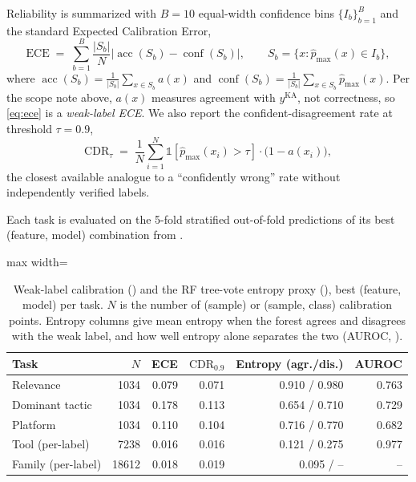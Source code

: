 \documentclass[preprint,12pt]{elsarticle}
\newenvironment{fittable}{\begin{adjustbox}{max width=\textwidth}}{\end{adjustbox}}
\begin{document}
Reliability is summarized with $B{=}10$ equal-width confidence bins
$\{I_b\}_{b=1}^{B}$ and the standard Expected Calibration Error,
\begin{equation}
\label{eq:ece}
\mathrm{ECE} \;=\; \sum_{b=1}^{B} \frac{|S_b|}{N}
  \left\lvert \operatorname{acc}(S_b) - \operatorname{conf}(S_b) \right\rvert,
\qquad
S_b = \{x : \hat p_{\max}(x) \in I_b\},
\end{equation}
where $\operatorname{acc}(S_b) = \frac{1}{|S_b|}\sum_{x \in S_b} a(x)$ and
$\operatorname{conf}(S_b) = \frac{1}{|S_b|}\sum_{x \in S_b} \hat p_{\max}(x)$.
Per the scope note above, $a(x)$ measures agreement with $y^{\mathrm{KA}}$,
not correctness, so \cref{eq:ece} is a \emph{weak-label ECE}. We also report
the confident-disagreement rate at threshold $\tau=0.9$,
\begin{equation}
\label{eq:cdr}
\mathrm{CDR}_\tau \;=\; \frac{1}{N}\sum_{i=1}^N
  \mathbb{1}\!\left[\hat p_{\max}(x_i) > \tau\right]\cdot\bigl(1-a(x_i)\bigr),
\end{equation}
the closest available analogue to a ``confidently wrong'' rate without
independently verified labels.

Each task is evaluated on the 5-fold stratified out-of-fold predictions
of its best (feature, model) combination from .

\begin{table}[htbp]
\centering
\caption{Weak-label calibration () and the RF
  tree-vote entropy proxy (), best (feature, model) per
  task. $N$ is the number of (sample) or (sample, class) calibration
  points. Entropy columns give mean entropy when the forest agrees and
  disagrees with the weak label, and how well entropy alone separates the
  two (AUROC, ).}
\label{tab:calibration}
\begin{fittable}
\begin{tabular}{lrrrrr}
\toprule
Task & $N$ & ECE & $\mathrm{CDR}_{0.9}$ & Entropy (agr./dis.) & AUROC \\
\midrule
Relevance        & 1034 & 0.079 & 0.071 & 0.910 / 0.980 & 0.763 \\
Dominant tactic   & 1034 & 0.178 & 0.113 & 0.654 / 0.710 & 0.729 \\
Platform          & 1034 & 0.110 & 0.104 & 0.716 / 0.770 & 0.682 \\
Tool (per-label)  & 7238 & 0.016 & 0.016 & 0.121 / 0.275 & 0.977 \\
Family (per-label)& 18612 & 0.018 & 0.019 & 0.095 / --     & --    \\
\bottomrule
\end{tabular}
\end{fittable}
\end{table}
\end{document}
